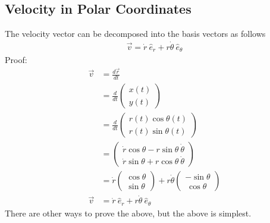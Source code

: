 \documentclass{article}
\begin{document}
\subsection{Velocity in Polar Coordinates}
The velocity vector can be decomposed into the basis vectors as follows
\begin{align}
    \vec{v} = \dot{r}\ \hat{e}_r + r \dot{\theta}\ \hat{e}_\theta
\end{align}
Proof:
\begin{align}
    \vec{v} &= \frac{d\vec{r}}{dt} \\
    &= \frac{d}{dt} \left(\begin{array}{l}
         x(t) \\
         y(t) 
    \end{array}\right) \\
    &= \frac{d}{dt} \left(\begin{array}{l}
         r(t) \cos \theta(t) \\
         r(t) \sin \theta(t)
    \end{array}\right) \\
    &= \left(\begin{array}{l}
         \dot{r} \cos\theta - r\sin\theta\ \dot\theta \\
         \dot{r} \sin\theta + r\cos\theta\ \dot\theta
    \end{array}\right) \\
    &= \dot{r} \left(\begin{array}{l}
         \cos\theta \\
         \sin\theta
    \end{array}\right) + r \dot{\theta} \left(\begin{array}{l}
         -\sin\theta \\
         \ \cos\theta
    \end{array}\right) \\
    \vec{v} &= \dot{r}\ \hat{e}_r + r \dot{\theta}\ \hat{e}_\theta \label{eq:vpolar}
\end{align}
There are other ways to prove the above, but the above is simplest. 
\end{document}
